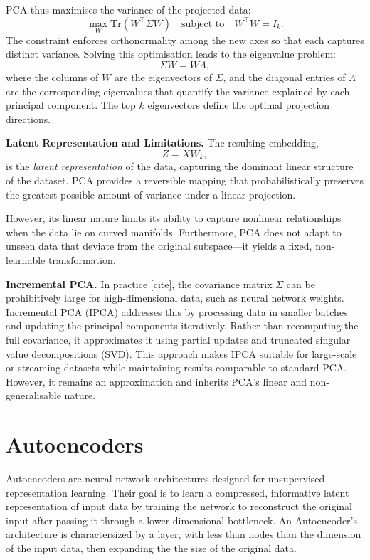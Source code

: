 PCA thus maximises the variance of the projected data:
\[
\max_{W} \text{Tr}(W^\top \Sigma W)
\quad \text{subject to} \quad W^\top W = I_k.
\]
The constraint enforces orthonormality among the new axes so that each captures distinct variance. Solving this optimisation leads to the eigenvalue problem:
\[
\Sigma W = W \Lambda,
\]
where the columns of \( W \) are the eigenvectors of \( \Sigma \), and the diagonal entries of \( \Lambda \) are the corresponding eigenvalues that quantify the variance explained by each principal component. The top \( k \) eigenvectors define the optimal projection directions.

\vspace{0.5em}
\noindent
\textbf{Latent Representation and Limitations.}
The resulting embedding,
\[
Z = X W_k,
\]
is the \textit{latent representation} of the data, capturing the dominant linear structure of the dataset.  
PCA provides a reversible mapping that probabilistically preserves the greatest possible amount of variance under a linear projection. 

However, its linear nature limits its ability to capture nonlinear relationships when the data lie on curved manifolds. Furthermore, PCA does not adapt to unseen data that deviate from the original subspace—it yields a fixed, non-learnable transformation.

\vspace{0.5em}
\noindent
\textbf{Incremental PCA.}
In practice [cite], the covariance matrix \( \Sigma \) can be prohibitively large for high-dimensional data, such as neural network weights. Incremental PCA (IPCA) addresses this by processing data in smaller batches and updating the principal components iteratively. Rather than recomputing the full covariance, it approximates it using partial updates and truncated singular value decompositions (SVD).  
This approach makes IPCA suitable for large-scale or streaming datasets while maintaining results comparable to standard PCA. However, it remains an approximation and inherits PCA’s linear and non-generalisable nature.

\section{Autoencoders}
\label{sec:autoencoders}

Autoencoders are neural network architectures designed for unsupervised representation learning. Their goal is to learn a compressed, informative latent representation of input data by training the network to reconstruct the original input after passing it through a lower-dimensional bottleneck. An Autoencoder's architecture is charactersized by a layer, with less than nodes than the dimension of the input data, then expanding the the size of the original data. 

